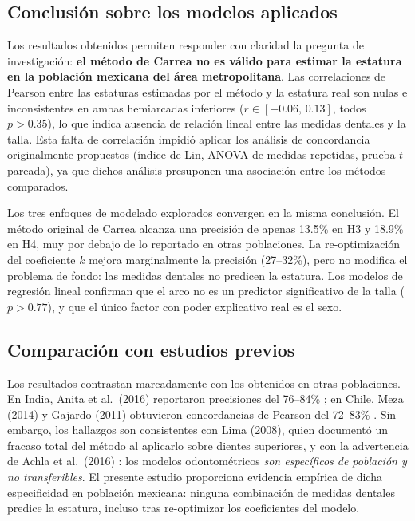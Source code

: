 \documentclass[11pt,letterpaper]{article}
\begin{document}
\subsection*{Conclusión sobre los modelos aplicados}

Los resultados obtenidos permiten responder con claridad la pregunta de investigación: \textbf{el método de Carrea no es válido para estimar la estatura en la población mexicana del área metropolitana}. Las correlaciones de Pearson entre las estaturas estimadas por el método y la estatura real son nulas e inconsistentes en ambas hemiarcadas inferiores ($r \in [-0.06,\, 0.13]$, todos $p > 0.35$), lo que indica ausencia de relación lineal entre las medidas dentales y la talla. Esta falta de correlación impidió aplicar los análisis de concordancia originalmente propuestos (índice de Lin, ANOVA de medidas repetidas, prueba $t$ pareada), ya que dichos análisis presuponen una asociación entre los métodos comparados.

Los tres enfoques de modelado explorados convergen en la misma conclusión. El método original de Carrea alcanza una precisión de apenas 13.5\% en H3 y 18.9\% en H4, muy por debajo de lo reportado en otras poblaciones. La re-optimización del coeficiente $k$ mejora marginalmente la precisión (27--32\%), pero no modifica el problema de fondo: las medidas dentales no predicen la estatura. Los modelos de regresión lineal confirman que el arco no es un predictor significativo de la talla ($p > 0.77$), y que el único factor con poder explicativo real es el sexo.

\subsection*{Comparación con estudios previos}

Los resultados contrastan marcadamente con los obtenidos en otras poblaciones. En India, Anita et al.\ (2016) reportaron precisiones del 76--84\% \cite{Anita2016}; en Chile, Meza (2014) y Gajardo (2011) obtuvieron concordancias de Pearson del 72--83\% \cite{meza2014, Brito2022}. Sin embargo, los hallazgos son consistentes con Lima (2008), quien documentó un fracaso total del método al aplicarlo sobre dientes superiores, y con la advertencia de Achla et al.\ (2016) \cite{yadav2016}: los modelos odontométricos \textit{son específicos de población y no transferibles}. El presente estudio proporciona evidencia empírica de dicha especificidad en población mexicana: ninguna combinación de medidas dentales predice la estatura, incluso tras re-optimizar los coeficientes del modelo.
\end{document}
